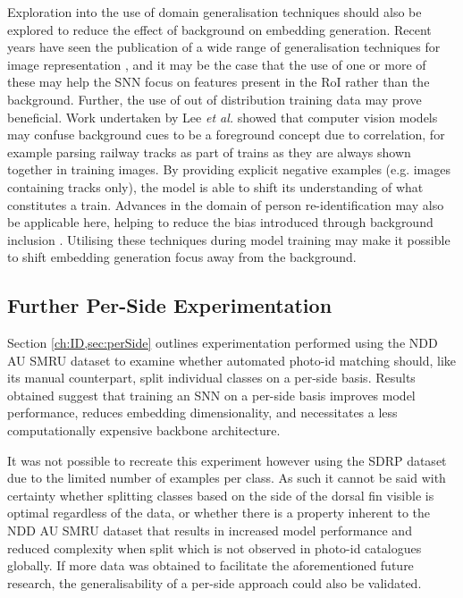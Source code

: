 Exploration into the use of domain generalisation techniques should also be explored to reduce the effect of background on embedding generation. Recent years have seen the publication of a wide range of generalisation techniques for image representation \cite{zheng_exploiting_2019, yan_clusterfit_2020, creager_environment_2021, zhou_domain_2022, tommasi_domain_2015, cohn_improving_1994, neyshabur_exploring_2017}, and it may be the case that the use of one or more of these may help the SNN focus on features present in the RoI rather than the background. Further, the use of out of distribution training data may prove beneficial. Work undertaken by Lee \textit{et al.} \cite{lee_weakly_2022} showed that computer vision models may confuse background cues to be a foreground concept due to correlation, for example parsing railway tracks as part of trains as they are always shown together in training images. By providing explicit negative examples (e.g. images containing tracks only), the model is able to shift its understanding of what constitutes a train. Advances in the domain of person re-identification may also be applicable here, helping to reduce the bias introduced through background inclusion \cite{nguyen_background_2016, huang_sbsgan_2019, tian_eliminating_2018}. Utilising these techniques during model training may make it possible to shift embedding generation focus away from the background. 

\subsection{Further Per-Side Experimentation}\label{ch:Conclusion,sec:FutureWork,sub:MorePerSide}

Section \ref{ch:ID,sec:perSide} outlines experimentation performed using the NDD AU SMRU dataset to examine whether automated photo-id matching should, like its manual counterpart, split individual classes on a per-side basis. Results obtained suggest that training an SNN on a per-side basis improves model performance, reduces embedding dimensionality, and necessitates a less computationally expensive backbone architecture.

It was not possible to recreate this experiment however using the SDRP dataset due to the limited number of examples per class. As such it cannot be said with certainty whether splitting classes based on the side of the dorsal fin visible is optimal regardless of the data, or whether there is a property inherent to the NDD AU SMRU dataset that results in increased model performance and reduced complexity when split which is not observed in photo-id catalogues globally. If more data was obtained to facilitate the aforementioned future research, the generalisability of a per-side approach could also be validated.  

